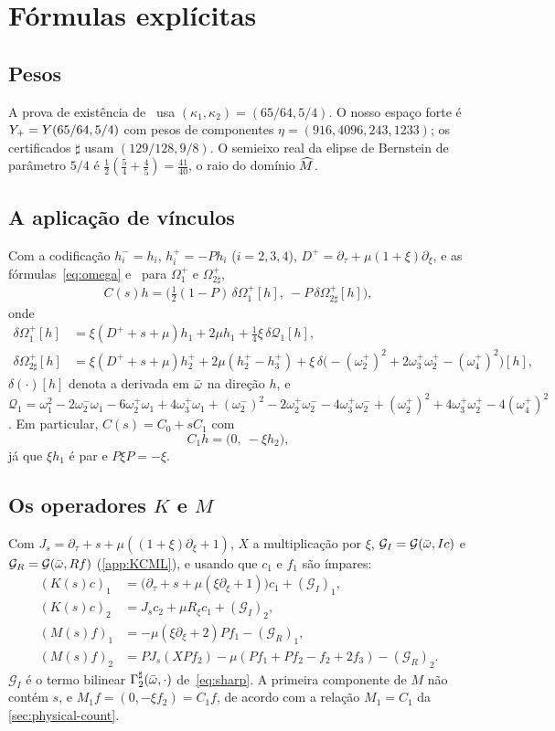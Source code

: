 \section{Fórmulas explícitas}\label{app:formulas}

\subsection{Pesos}
A prova de existência de~\cite{RT2019} usa $(\kappa_1,\kappa_2)=(65/64,5/4)$. O nosso espaço forte é $Y_{+}=Y(65/64,5/4)$
com pesos de componentes $\eta=(916,4096,243,1233)$; os certificados $\sharp$ usam $(129/128,9/8)$. O semieixo real
da elipse de Bernstein de parâmetro $5/4$ é $\tfrac12(\tfrac54+\tfrac45)=\tfrac{41}{40}$, o raio do
domínio $\widehat M$.

\subsection{A aplicação de vínculos}
Com a codificação $h_i^-=h_i$, $h_i^+=-Ph_i$ ($i=2,3,4$), $D^+=\partial_\tau+\mu(1+\xi)\partial_\xi$, e as
fórmulas~\eqref{eq:omega} e~\cite[\S2]{RT2019} para $\Omega_1^+$ e $\Omega_{2\sharp}^+$,
\[
  C(s)h=\Big(\tfrac12(1-P)\,\delta\Omega_1^+[h],\ -P\,\delta\Omega_{2\sharp}^+[h]\Big),
\]
onde
\begin{align*}
  \delta\Omega_1^+[h]&=\xi(D^++s+\mu)h_1+2\mu h_1+\tfrac14\xi\,\delta\mathcal Q_1[h],\\
  \delta\Omega_{2\sharp}^+[h]&=\xi(D^++s+\mu)h_2^++2\mu(h_2^+-h_3^+)
    +\xi\,\delta\big(-(\omega_2^+)^2+2\omega_3^+\omega_2^+-(\omega_4^+)^2\big)[h],
\end{align*}
$\delta(\cdot)[h]$ denota a derivada em $\bar\omega$ na direção $h$, e
$\mathcal Q_1=\omega_1^2-2\omega_2^-\omega_1-6\omega_2^+\omega_1+4\omega_3^+\omega_1+(\omega_2^-)^2-2\omega_2^+\omega_2^-
-4\omega_3^+\omega_2^-+(\omega_2^+)^2+4\omega_3^+\omega_2^+-4(\omega_4^+)^2$. Em particular, $C(s)=C_0+sC_1$ com
\[
  C_1h=\big(0,\ -\xi h_2\big),
\]
já que $\xi h_1$ é par e $P\xi P=-\xi$.

\subsection{Os operadores $K$ e $M$}
Com $J_s=\partial_\tau+s+\mu((1+\xi)\partial_\xi+1)$, $X$ a multiplicação por $\xi$,
$\mathcal G_I=\mathcal G(\bar\omega,Ic)$ e $\mathcal G_R=\mathcal G(\bar\omega,Rf)$ (\cref{app:KCML}), e usando que
$c_1$ e $f_1$ são ímpares:
\begin{align*}
  (K(s)c)_1&=\big(\partial_\tau+s+\mu(\xi\partial_\xi+1)\big)c_1+(\mathcal G_I)_1,\\
  (K(s)c)_2&=J_sc_2+\mu R_\xi c_1+(\mathcal G_I)_2,\\
  (M(s)f)_1&=-\mu(\xi\partial_\xi+2)Pf_1-(\mathcal G_R)_1,\\
  (M(s)f)_2&=PJ_s(XPf_2)-\mu(Pf_1+Pf_2-f_2+2f_3)-(\mathcal G_R)_2 .
\end{align*}
$\mathcal G_I$ é o termo bilinear $\Gamma_2^\sharp(\bar\omega,\cdot)$ de~\eqref{eq:sharp}. A primeira componente de $M$ não
contém $s$, e $M_1f=(0,-\xi f_2)=C_1f$, de acordo com a relação $M_1=C_1$ da \cref{sec:physical-count}.
